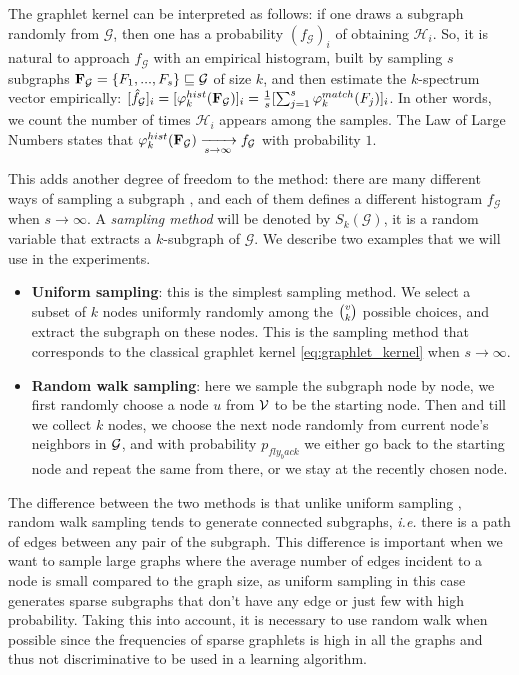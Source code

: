 The graphlet kernel can be interpreted as follows: if one draws a subgraph randomly from $\mathcal{G}$, then one has a probability $(f_\mathcal{G})_i$ of obtaining $\mathcal{H}_i$. So, it is natural to approach $f_\mathcal{G}$ with an empirical histogram, built by  sampling $s$ subgraphs $\mathbf{F}_{\mathcal{G}}=\{F_1,...,F_s\} \sqsubseteq \mathcal{G}$ of size $k$, and then estimate the $k$-spectrum vector empirically: $[\hat f_\mathcal{G}]_i =[\varphi_k^{hist}(\mathbf{F}_{\mathcal{G}})]_i= \frac{1}{s}[\sum_{j=1}^s \varphi^{match}_k(F_j)]_i$. In other words, we count the number of times $\mathcal{H}_i$ appears among the samples. The Law of Large Numbers states that $\varphi_k^{hist}(\mathbf{F}_{\mathcal{G}}) \xrightarrow[s \to \infty]{} f_\mathcal{G}$ with probability $1$.

This adds another degree of freedom to the method: there are many different ways of sampling a subgraph \citep{graph_sampling}, and each of them defines a different histogram $f_\mathcal{G}$ when $s \to \infty$. A \emph{sampling method} will be denoted by $S_k(\mathcal{G})$, it is a random variable that extracts a $k$-subgraph of $\mathcal{G}$. We describe two examples that we will use in the experiments.
\begin{itemize}
\item \textbf{Uniform sampling}: this is the simplest sampling method. We select a subset of $k$ nodes uniformly randomly among the $\tbinom{v}{k}$ possible choices, and extract the subgraph on these nodes. This is the sampling method that corresponds to the classical graphlet kernel \eqref{eq:graphlet_kernel} when $s \to \infty$.
\item \textbf{Random walk sampling}: here we sample the subgraph node by node, we first randomly choose a node $u$ from $\mathcal{V}$ to be the starting node. Then and till we collect $k$ nodes, we choose the next node randomly from current node's neighbors in $\mathcal{G}$, and with probability $p_{fly_back}$ we either go back to the starting node and repeat the same from there, or we stay at the recently chosen node.
\end{itemize}
The difference between the two methods is that unlike uniform sampling , random walk sampling tends to generate connected subgraphs, \emph{i.e.} there is a path of edges between any pair of the subgraph. This difference is important when we want to sample large graphs where the average number of edges incident to a node is small compared to the graph size, as uniform sampling in this case generates sparse subgraphs that don't have any edge or just few with high probability. Taking this into account, it is necessary to use random walk when possible since the frequencies of sparse graphlets is high in all the graphs and thus not  discriminative to be used in a learning algorithm.

